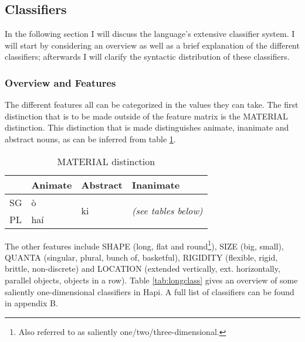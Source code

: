 \documentclass[a4paper, 12pt, oneside]{memoir}
\begin{document}
\subsection{Classifiers}\label{sclassifier}
In the following section I will discuss the language's extensive classifier system. I will start by considering an overview as well as a brief explanation of the different classifiers; afterwards I will clarify the syntactic distribution of these classifiers. 
\subsubsection{Overview and Features}
The different features all can be categorized in the values they can take. The first distinction that is to be made outside of the feature matrix is the MATERIAL distinction. This distinction that is made distinguishes animate, inanimate and abstract nouns, as can be inferred from table \ref{t:clmaterial}.
\begin{table}[H]
\begin{centering}
\begin{tabular}{@{}llll@{}}
\toprule
   & Animate & Abstract            & Inanimate                           \\ \midrule
SG & ò      & \multirow{2}{*}{ki} & \multirow{2}{*}{\textit{(see tables below)}} \\
PL & haí     &                     &                                     \\ \bottomrule
\end{tabular}
\caption{MATERIAL distinction}
\label{t:clmaterial}
\end{centering}
\end{table}

The other features include SHAPE (long, flat and round\footnote{Also referred to as saliently one/two/three-dimensional.}), SIZE (big, small), QUANTA (singular, plural, bunch of, basketful), RIGIDITY (flexible, rigid, brittle, non-discrete) and LOCATION (extended vertically, ext. horizontally, parallel objects, objects in a row). Table \ref{tab:longclass} gives an overview of some saliently one-dimensional classifiers in Hapi. A full list of classifiers can be found in appendix B.
\end{document}
